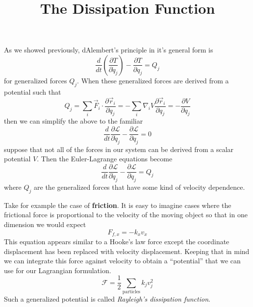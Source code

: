 \documentclass{article}
\title{The Dissipation Function}
\begin{document}
\maketitle

As we showed previously, dAlembert's principle in it's general form is
\begin{equation}
  \frac{d}{dt}\left( \frac{\partial T}{\partial \dot{q}_j} \right)-\frac{\partial T}{\partial q_j} = Q_j
\end{equation}
for generalized forces $Q_j$. When these generalized forces are derived from a
potential such that
\begin{equation}
  Q_j = \sum_i \vec{F}_i\cdot\frac{\partial \vec{r}_i}{\partial q_j} = -\sum_i\nabla_iV\frac{\partial \vec{r}_i}{\partial q_j} = -\frac{\partial V}{\partial q_j}
\end{equation}
then we can simplify the above to the familiar
\begin{equation}
  \frac{d}{dt}\frac{\partial \mathcal{L}}{\partial \dot{q}_j}-\frac{\partial \mathcal{L}}{\partial q_j} = 0 
\end{equation}
suppose that not all of the forces in our system can be derived from a scalar
potential $V$. Then the Euler-Lagrange equations become
\begin{equation}
  \frac{d}{dt}\frac{\partial \mathcal{L}}{\partial \dot{q}_j}-\frac{\partial \mathcal{L}}{\partial q_j} = Q_j
\end{equation}
where $Q_j$ are the generalized forces that have some kind of velocity
dependence. 

Take for example the case of \textbf{friction}. It is easy to imagine cases
where the frictional force is proportional to the velocity of the moving object
so that in one dimension we would expect
\begin{equation}
  F_{f,x} = -k_xv_x
\end{equation}
This equation appears similar to a Hooke's law force except the coordinate
displacement has been replaced with velocity displacement. Keeping that in mind
we can integrate this force against velocity to obtain a ``potential'' that we
can use for our Lagrangian formulation. 
\begin{equation}
  \mathcal{F} = \frac{1}{2} \sum\limits_{\textrm{particles}}k_jv_j^2
\end{equation}
Such a generalized potential is called \textit{Rayleigh's dissipation function}. 
\end{document}

